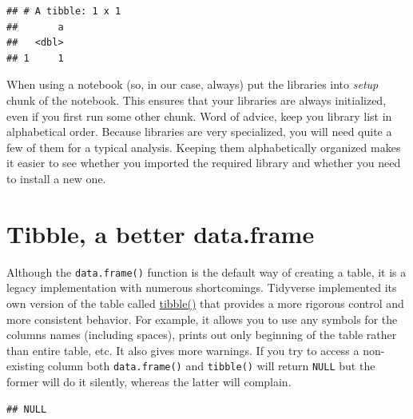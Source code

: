 \documentclass[
]{book}
\newenvironment{Shaded}{\begin{snugshade}}{\end{snugshade}}
\newcommand{\AttributeTok}[1]{\textcolor[rgb]{0.77,0.63,0.00}{#1}}
\newcommand{\CommentTok}[1]{\textcolor[rgb]{0.56,0.35,0.01}{\textit{#1}}}
\newcommand{\DecValTok}[1]{\textcolor[rgb]{0.00,0.00,0.81}{#1}}
\newcommand{\FunctionTok}[1]{\textcolor[rgb]{0.00,0.00,0.00}{#1}}
\newcommand{\NormalTok}[1]{#1}
\newcommand{\OtherTok}[1]{\textcolor[rgb]{0.56,0.35,0.01}{#1}}
\newcommand{\SpecialCharTok}[1]{\textcolor[rgb]{0.00,0.00,0.00}{#1}}
\begin{document}
\begin{verbatim}
## # A tibble: 1 x 1
##       a
##   <dbl>
## 1     1
\end{verbatim}

When using a notebook (so, in our case, always) put the libraries into \emph{setup} chunk of the notebook. This ensures that your libraries are always initialized, even if you first run some other chunk. Word of advice, keep you library list in alphabetical order. Because libraries are very specialized, you will need quite a few of them for a typical analysis. Keeping them alphabetically organized makes it easier to see whether you imported the required library and whether you need to install a new one.

\hypertarget{tibble}{%
\section{Tibble, a better data.frame}\label{tibble}}

Although the \texttt{data.frame()} function is the default way of creating a table, it is a legacy implementation with numerous shortcomings. Tidyverse implemented its own version of the table called \href{https://tibble.tidyverse.org/}{tibble()} that provides a more rigorous control and more consistent behavior. For example, it allows you to use any symbols for the columns names (including spaces), prints out only beginning of the table rather than entire table, etc. It also gives more warnings. If you try to access a non-existing column both \texttt{data.frame()} and \texttt{tibble()} will return \texttt{NULL} but the former will do it silently, whereas the latter will complain.

\begin{Shaded}
\end{Shaded}

\begin{verbatim}
## NULL
\end{verbatim}

\begin{Shaded}
\end{Shaded}
\end{document}
